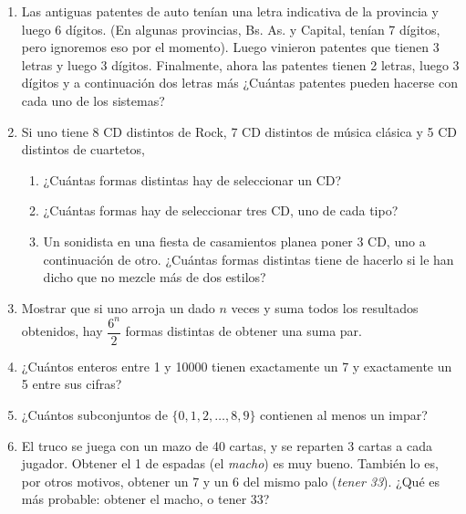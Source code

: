 \documentclass[12pt,spanish,makeidx]{amsbook}
\begin{document}
\begin {enumerate}
\smallskip

\item Las antiguas patentes de auto tenían una letra indicativa de la provincia y luego 6 dígitos. (En algunas provincias, Bs. As. y Capital, tenían 7 dígitos, pero ignoremos eso por el momento). Luego  vinieron patentes que tienen 3 letras y luego 3 dígitos. Finalmente, ahora las patentes tienen 2 letras, luego 3 dígitos y a continuación dos letras más ¿Cuántas patentes pueden hacerse con cada uno de los sistemas?

\smallskip

\item Si uno tiene 8 CD distintos de Rock, 7 CD distintos de música clásica y 5 CD distintos de cuartetos,
\begin{enumerate}
	\item ¿Cuántas formas distintas hay de seleccionar un CD?

	\item ¿Cuántas formas hay de seleccionar tres CD, uno de cada tipo?

	\item Un sonidista en una fiesta de casamientos planea poner 3 CD, uno a continuación de otro. ¿Cuántas formas distintas tiene de hacerlo si le han dicho que no mezcle más de dos estilos?
\end{enumerate}

\smallskip

\item Mostrar que si uno arroja un dado $n$ veces y suma todos los resultados obtenidos, hay $\dfrac{6^n}{2}$ formas distintas de obtener una suma par.

\smallskip

\item ¿Cuántos enteros entre 1 y 10000 tienen exactamente un 7 y exactamente un 5 entre sus cifras?

\smallskip

\item ¿Cuántos subconjuntos de $\{0,1,2,\dots,8,9\}$ contienen al menos un impar?

\smallskip

\item El truco se juega con un mazo de 40 cartas, y se reparten 3 cartas a cada jugador. Obtener el 1 de espadas (el {\it macho}) es muy bueno. También lo es, por otros motivos, obtener un 7 y un 6 del mismo palo ({\it tener 33}). ¿Qué es más probable: obtener el macho, o tener 33?

\smallskip


\end{enumerate}
\end{document}
